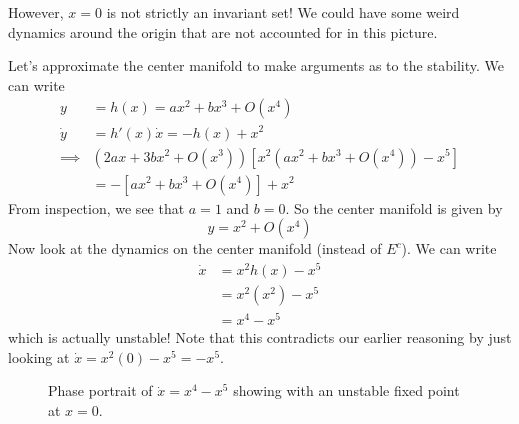 \documentclass{article}
\begin{document}
However, $x=0$ is not strictly an invariant set! We could have some weird dynamics around the origin that are not accounted for in this picture.

Let's approximate the center manifold to make arguments as to the stability. We can write 
\begin{align*}
    y&=h(x)=ax^2+bx^3+O(x^4)\\
    \dot{y}&=h'(x)\dot{x}=-h(x)+x^2\\
    \implies&\left(2ax+3bx^2+O(x^3)\right)\left[x^2\left(ax^2+bx^3+O(x^4)\right)-x^5\right]\\
    &=-\left[ax^2+bx^3+O(x^4)\right] + x^2
\end{align*}
From inspection, we see that $a=1$ and $b=0$. So the center manifold is given by 
\[
y=x^2+O(x^4)
\]
Now look at the dynamics on the center manifold (instead of $E^c$). We can write 
\begin{align*}
    \dot{x}&=x^2h(x)-x^5\\
    &=x^2(x^2)-x^5\\
    &=x^4-x^5
\end{align*}
which is actually unstable! Note that this contradicts our earlier reasoning by just looking at $\dot{x}=x^2(0)-x^5=-x^5$.

\begin{figure}[ht]
    \centering
    \vspace{0.5cm}
    \vspace{0.5cm}
    \caption{Phase portrait of $\dot{x}=x^4-x^5$ showing with an unstable fixed point at $x = 0$.}
\end{figure}
\end{document}
